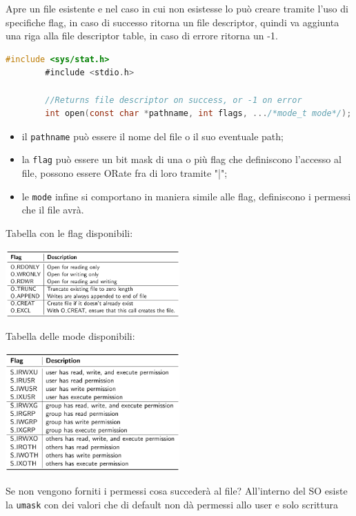 \documentclass[a4paper, 12pt]{book}
\begin{document}
    Apre un file esistente e nel caso in cui non esistesse 
    lo può creare tramite l'uso di specifiche flag, in caso di 
    successo ritorna un file descriptor, quindi va aggiunta 
    una riga alla file descriptor table, in caso di errore
    ritorna un -1.
    \begin{lstlisting}[language=C]
        #include <sys/stat.h>
        #include <stdio.h>

        //Returns file descriptor on success, or -1 on error 
        int open(const char *pathname, int flags, .../*mode_t mode*/);
    \end{lstlisting}
    \begin{itemize}
        \item il \verb|pathname| può essere il nome del file o il suo eventuale path;
        \item la \verb|flag| può essere un bit mask di una o più flag che definiscono l'accesso al file, possono essere ORate fra di loro tramite "|";
        \item le \verb|mode| infine si comportano in maniera simile alle flag, definiscono i permessi che il file avrà.
    \end{itemize}
    Tabella con le flag disponibili:
    \begin{center}
        \includegraphics[width=0.5\textwidth]{flag_open.png}
    \end{center}
    Tabella delle mode disponibili:
    \begin{center}
        \includegraphics[width=0.5\textwidth]{mode_open.png}
    \end{center}
    Se non vengono forniti i permessi cosa succederà al file?
    All'interno del SO esiste la \verb|umask| con dei valori che 
    di default non dà permessi allo user e solo scrittura
\end{document}

